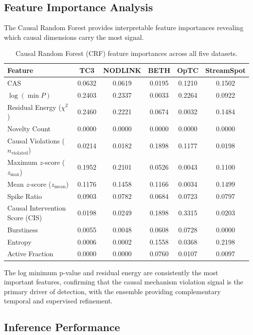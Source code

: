 \subsection{Feature Importance Analysis}

The Causal Random Forest provides interpretable feature importances revealing which causal dimensions carry the most signal.

\begin{table}[htbp]
\centering
\small
\caption{Causal Random Forest (CRF) feature importances across all five datasets.}
\begin{tabular}{lccccc}
\toprule
Feature & TC3 & NODLINK & BETH & OpTC & StreamSpot \\
\midrule
CAS & 0.0632 & 0.0619 & 0.0195 & 0.1210 & 0.1502 \\
$\log(\min P)$ & 0.2403 & 0.2337 & 0.0033 & 0.2264 & 0.0922 \\
Residual Energy ($\chi^2$) & 0.2460 & 0.2221 & 0.0674 & 0.0032 & 0.1484 \\
Novelty Count & 0.0000 & 0.0000 & 0.0000 & 0.0000 & 0.0000 \\
Causal Violations ($n_{\text{violated}}$) & 0.0214 & 0.0182 & 0.1898 & 0.1177 & 0.0198 \\
Maximum $z$-score ($z_{\max}$) & 0.1952 & 0.2101 & 0.0526 & 0.0043 & 0.1100 \\
Mean $z$-score ($z_{\text{mean}}$) & 0.1176 & 0.1458 & 0.1166 & 0.0034 & 0.1499 \\
Spike Ratio & 0.0903 & 0.0782 & 0.0684 & 0.0723 & 0.0797 \\
Causal Intervention Score (CIS) & 0.0198 & 0.0249 & 0.1898 & 0.3315 & 0.0203 \\
Burstiness & 0.0055 & 0.0048 & 0.0608 & 0.0728 & 0.0000 \\
Entropy & 0.0006 & 0.0002 & 0.1558 & 0.0368 & 0.2198 \\
Active Fraction & 0.0000 & 0.0000 & 0.0760 & 0.0107 & 0.0097 \\
\bottomrule
\end{tabular}
\label{tab:feature_importance_v2}
\end{table}

The log minimum p-value and residual energy are consistently the most important features, confirming that the causal mechanism violation signal is the primary driver of detection, with the ensemble providing complementary temporal and supervised refinement.

\subsection{Inference Performance}

